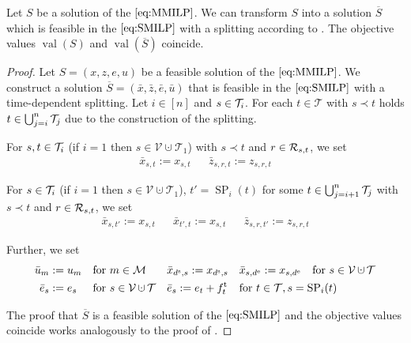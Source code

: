 \begin{lemma}
\label{lem:equivalence_MMILP_SMILP}

Let $S$ be a solution of the $\eqref{eq:MMILP}$. We can transform $S$ into a solution $\overline{S}$ which is feasible in the $\eqref{eq:SMILP}$ with a splitting according to . The objective values $\operatorname{val}(S)$ and $\operatorname{val}(\overline{S})$ coincide.

\end{lemma}

\begin{proof}

Let ${S=\left(x,z,e,u\right)}$ be a feasible solution of the $\eqref{eq:MMILP}$. We construct a solution ${\overline{S}=\left(\bar{x},\bar{z},\bar{e},\bar{u}\right)}$ that is feasible in the $\eqref{eq:SMILP}$ with a time-dependent splitting. Let $i\in[n]$ and ${s\in\mathcal{T}_i}$. For each ${t\in\mathcal{T}}$ with ${s\prec t}$ holds ${t\in\bigcup_{j=i}^n\mathcal{T}_j}$ due to the construction of the splitting.

For ${s,t\in\mathcal{T}_i}$ (if $i=1$ then $s\in\mathcal{V}\cupdot\mathcal{T}_1$) with ${s\prec t}$ and ${r\in\mathcal{R}_{s,t}}$, we set
\begin{align*}
	\bar{x}_{s,t} := x_{s,t} && \bar{z}_{s,r,t} := z_{s,r,t}
\end{align*}

For ${s\in\mathcal{T}_i}$ (if $i=1$ then $s\in\mathcal{V}\cupdot\mathcal{T}_1$), ${t'=\operatorname{SP}_i(t)}$ for some ${t\in\bigcup_{j=i+1}^n\mathcal{T}_j}$ with ${s\prec t}$ and ${r\in\mathcal{R}_{s,t}}$, we set
\begin{align*}
	\bar{x}_{s,t'} := x_{s,t} && \bar{x}_{t',t} := x_{s,t} && \bar{z}_{s,r,t'} := z_{s,r,t}
\end{align*}

Further, we set
\begin{align*}
	\bar{u}_m & := u_m && \text{for } m\in\mathcal{M} && \bar{x}_{\ds,s} := x_{\ds,s} && \bar{x}_{s,\de} := x_{s,\de} && \text{for } s\in\mathcal{V}\cupdot\mathcal{T} \\
	\bar{e}_s & := e_s && \text{for } s\in\mathcal{V}\cupdot\mathcal{T} && \bar{e}_s := e_t + \ft_t && \omit\rlap{for $t\in\mathcal{T}, s=\operatorname{SP}_i(t)$}
\end{align*}

The proof that $\overline{S}$ is a feasible solution of the $\eqref{eq:SMILP}$ and the objective values coincide works analogously to the proof of .

\end{proof}

